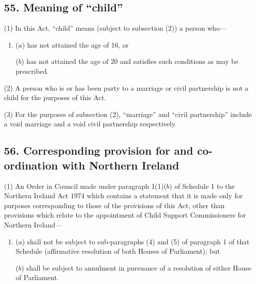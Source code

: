 \documentclass[a4paper]{article}
\begin{document}
\subsection{55. Meaning of ``child''}

(1) In this Act, “child” means (subject to subsection (2)) a person who---
\begin{enumerate}\item[]
($a$) has not attained the age of 16, or

($b$) has not attained the age of 20 and satisfies such conditions as may be prescribed.
\end{enumerate}

(2)
A person who is or has been party to a marriage or civil partnership is not a child for the purposes of this Act.

(3)
For the purposes of subsection (2), “marriage” and “civil partnership” include a void marriage and a void civil partnership respectively.


\subsection{56. Corresponding provision for and co-ordination with Northern Ireland}

(1) An Order in Council made under paragraph 1(1)($b$) of Schedule 1 to the Northern Ireland Act 1974 which contains a statement that it is made only for purposes corresponding to those of the provisions of this Act, other than provisions which relate to the appointment of Child Support Commissioners for Northern Ireland---
\begin{enumerate}\item[]
($a$) shall not be subject to sub-paragraphs (4) and (5) of paragraph 1 of that Schedule (affirmative resolution of both Houses of Parliament); but

($b$) shall be subject to annulment in pursuance of a resolution of either House of Parliament.
\end{enumerate}
\end{document}
